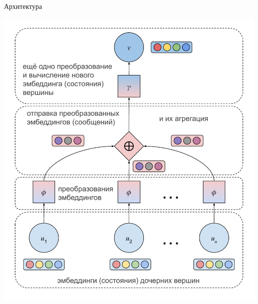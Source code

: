 \documentclass[14pt,aspectratio=169,hyperref={pdftex,unicode},xcolor=dvipsnames]{beamer}
\begin{document}
\begin{frame}{Архитектура}
\begin{minipage}{0.5\textwidth}
\begin{center}
  \includegraphics[scale=0.35]{./assets/message-passing-nn-talk.pdf}
\end{center}

\end{minipage}

\end{frame}
\end{document}

